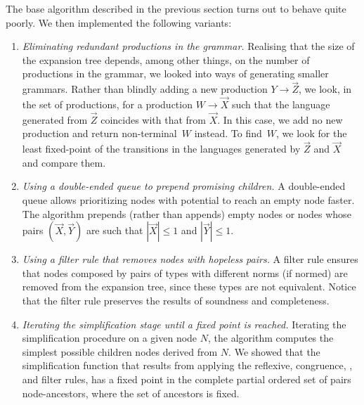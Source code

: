 The base algorithm described in the previous section turns out to
behave quite poorly. We then implemented the
following variants:
%
\begin{enumerate}
\item \emph{Eliminating redundant productions in the grammar.}
  Realising that the size of the expansion tree depends, among other
  things, on the number of productions in the grammar, we looked into
  ways of generating smaller grammars. Rather than blindly adding a
  new production $Y \rightarrow \vec Z$, we look, in the set of
  productions, for a production $W \rightarrow \vec X$ such that the
  language generated from $\vec Z$ coincides with that from $\vec
  X$. In this case, we add no new production and return
  non-terminal~$W$ instead. To find~$W$, we look for the least
  fixed-point of the transitions in the languages generated by
  $\vec Z$ and $\vec X$ and compare them.
  \item
  \emph{ Using a double-ended queue to prepend promising children.} A
  double-ended queue allows prioritizing nodes with potential to reach
  an empty node faster.  The algorithm prepends (rather than appends)
  empty nodes or nodes whose pairs $(\vec X, \vec Y)$ are such that
  $|\vec X|\leq 1$ and $|\vec Y| \leq 1$.
  \item
  \emph{Using a filter rule that removes nodes with hopeless pairs.} A
  filter rule ensures that nodes composed by pairs of types with
  different norms (if normed) are removed from the expansion tree,
  since these types are not equivalent.  Notice that the filter rule
  preserves the results of soundness and completeness.
  \item
  \emph{Iterating the simplification stage until a fixed point is
    reached.} Iterating the simplification procedure on a given node
  $N$, the algorithm computes the simplest possible children nodes
  derived from $N$. We showed that the simplification function that
  results from applying the reflexive, congruence, \BPA, and filter
  rules, has a fixed point in the complete partial ordered set of
  pairs node-ancestors, where the set of ancestors is fixed.
\end{enumerate}

